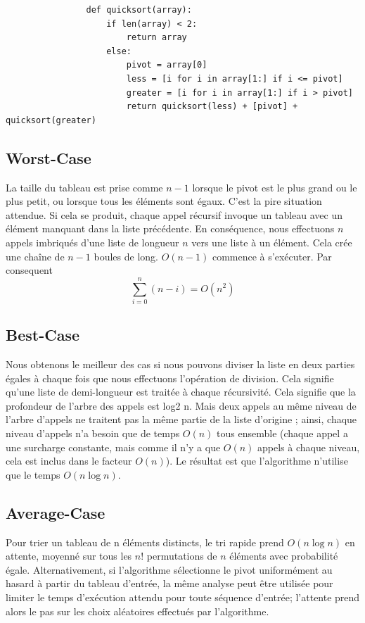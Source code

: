 \documentclass{article}
\begin{document}
            \begin{verbatim}
                def quicksort(array):
                    if len(array) < 2:
                        return array
                    else:
                        pivot = array[0]
                        less = [i for i in array[1:] if i <= pivot]
                        greater = [i for i in array[1:] if i > pivot]
                        return quicksort(less) + [pivot] + quicksort(greater)
            \end{verbatim}
            
            \subsection*{Worst-Case}
            La taille du tableau est prise comme $n-1$ lorsque le pivot est le plus grand ou le plus petit, ou lorsque tous les éléments sont égaux. C'est la pire situation attendue. 
            Si cela se produit, chaque appel récursif invoque un tableau avec un élément manquant dans la liste précédente. En conséquence, nous effectuons $n$ appels imbriqués d'une liste de longueur $n$ vers une liste à un élément. Cela crée une chaîne de $n-1$ boules de long. $O(n-1)$ commence à s'exécuter.
            Par consequent $$\sum_{i=0}^{n}(n-i) = O(n^2)  $$

            \subsection*{Best-Case}
            Nous obtenons le meilleur des cas si nous pouvons diviser la liste en deux parties égales à chaque fois que nous effectuons l'opération de division. Cela signifie qu'une liste de demi-longueur est traitée à chaque récursivité. Cela signifie que la profondeur de l'arbre des appels est log2 n. Mais deux appels au même niveau de l'arbre d'appels ne traitent pas la même partie de la liste d'origine ; ainsi, chaque niveau d'appels n'a besoin que de temps $O(n)$ tous ensemble (chaque appel a une surcharge constante, mais comme il n'y a que $O(n)$ appels à chaque niveau, cela est inclus dans le facteur $O(n)$). Le résultat est que l'algorithme n'utilise que le temps $O(n \log{n})$.

            \subsection*{Average-Case}
            Pour trier un tableau de n éléments distincts, le tri rapide prend $O(n \log{n})$ en attente, moyenné sur tous les $n!$ permutations de $n$ éléments avec probabilité égale. Alternativement, si l'algorithme sélectionne le pivot uniformément au hasard à partir du tableau d'entrée, la même analyse peut être utilisée pour limiter le temps d'exécution attendu pour toute séquence d'entrée; l'attente prend alors le pas sur les choix aléatoires effectués par l'algorithme.
\end{document}
